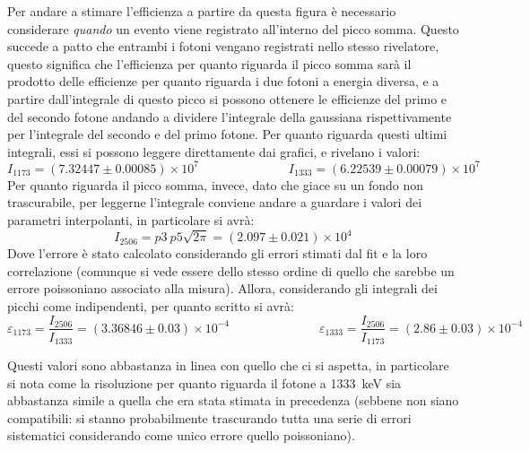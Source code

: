 Per andare a stimare l'efficienza a partire da questa figura è necessario considerare \textit{quando} un evento viene registrato all'interno del picco somma. Questo succede
a patto che entrambi i fotoni vengano registrati nello stesso rivelatore, questo significa che l'efficienza per quanto riguarda il picco somma sarà il prodotto delle efficienze
per quanto riguarda i due fotoni a energia diversa, e a partire dall'integrale di questo picco si possono ottenere le efficienze del primo e del secondo fotone andando a
dividere l'integrale della gaussiana rispettivamente per l'integrale del secondo e del primo fotone. Per quanto riguarda questi ultimi integrali, essi si possono leggere
direttamente dai grafici, e rivelano i valori:
$$I_{1173} = (7.32447 \pm 0.00085)\times 10^7 \hspace{3cm} I_{1333} = (6.22539 \pm 0.00079)\times 10^7$$
Per quanto riguarda il picco somma, invece, dato che giace su un fondo non trascurabile, per leggerne l'integrale conviene andare a guardare i valori dei parametri
interpolanti, in particolare si avrà:
$$I_{2506}= p3\ p5\sqrt{2\pi} = (2.097 \pm 0.021)\times 10^4$$
Dove l'errore è stato calcolato considerando gli errori stimati dal fit e la loro correlazione (comunque si vede essere dello stesso ordine di quello che sarebbe un errore
poissoniano associato alla misura). Allora, considerando gli integrali dei picchi come indipendenti, per quanto
scritto si avrà:
$$\varepsilon_{1173}=\frac{I_{2506}}{I_{1333}}=(3.36846 \pm 0.03)\times 10^{-4} \hspace{3cm} \varepsilon_{1333}=\frac{I_{2506}}{I_{1173}}=(2.86 \pm 0.03)\times 10^{-4}$$

Questi valori sono abbastanza in linea con quello che ci si aspetta, in particolare si nota come la risoluzione per quanto riguarda il fotone a 1333~keV sia abbastanza
simile a quella che era stata stimata in precedenza (sebbene non siano compatibili: si stanno probabilmente trascurando tutta una serie di errori sistematici considerando
come unico errore quello poissoniano).

